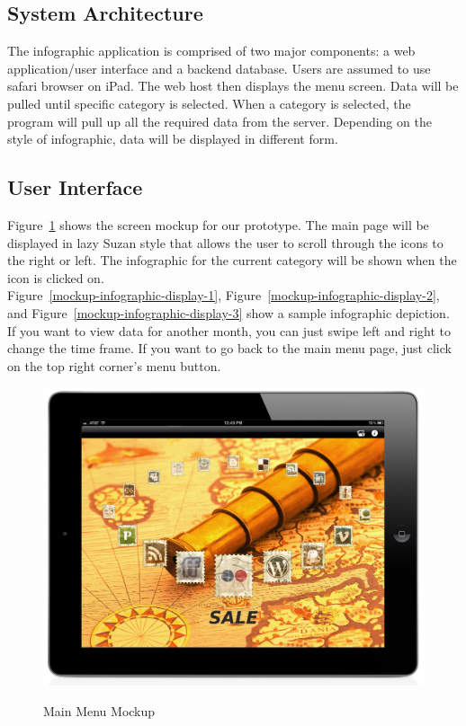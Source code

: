 \documentclass[11pt,a4paper,oneside]{article}
\begin{document}
\subsection{System Architecture}

The infographic application is comprised of two major components: a web application/user interface and a backend database. Users are assumed to use safari browser on iPad. The web host then displays the menu screen. Data will be pulled until specific category is selected. When a category is selected, the program will pull up all the required data from the server. Depending on the style of infographic, data will be displayed in different form.\\

\subsection{User Interface}

Figure~\ref{mockup-main-menu} shows the screen mockup for our prototype.  The main page will be displayed in lazy Suzan style that allows the user to scroll through the icons to the right or left.  The infographic for the current category will be shown when the icon is clicked on.\\


Figure~\ref{mockup-infographic-display-1}, Figure~\ref{mockup-infographic-display-2}, and Figure~\ref{mockup-infographic-display-3} show a sample infographic depiction.  If you want to view data for another month, you can just swipe left and right to change the time frame.  If you want to go back to the main menu page, just click on the top right corner’s menu button.\\


\begin{figure}[!]
\caption{Main Menu Mockup\label{mockup-main-menu}}
\includegraphics[width=1\textwidth]{images/screen.jpg}\\
\end{figure}
\end{document}
